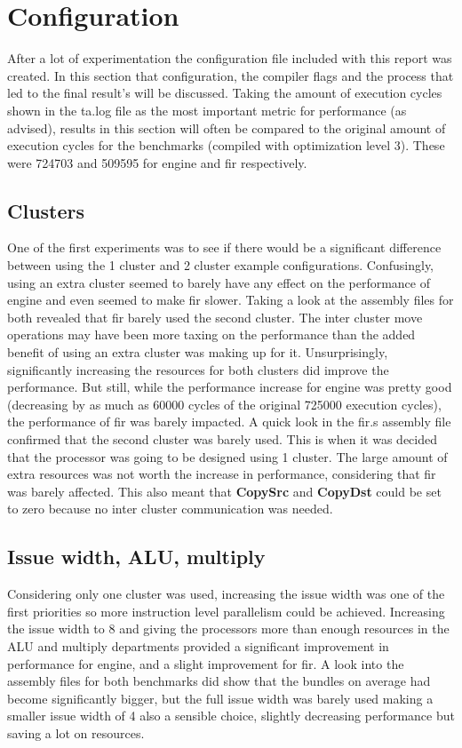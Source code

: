 \section{Configuration}
After a lot of experimentation the configuration file included with this report was created. In this section that configuration, the compiler flags and the process that led to the final result's will be discussed. Taking the amount of execution cycles shown in the ta.log file as the most important metric for performance (as advised), results in this section will often be compared to the original amount of execution cycles for the benchmarks (compiled with optimization level 3). These were 724703 and 509595 for engine and fir respectively.

\subsection{Clusters}
One of the first experiments was to see if there would be a significant difference between using the 1 cluster and 2 cluster example configurations. Confusingly, using an extra cluster seemed to barely have any effect on the performance of engine and even seemed to make fir slower. Taking a look at the assembly files for both revealed that fir barely used the second cluster. The inter cluster move operations may have been more taxing on the performance than the added benefit of using an extra cluster was making up for it. Unsurprisingly, significantly increasing the resources for both clusters did improve the performance. But still, while the performance increase for engine was pretty good (decreasing by as much as 60000 cycles of the original 725000 execution cycles), the performance of fir was barely impacted. A quick look in the fir.s assembly file confirmed that the second cluster was barely used. This is when it was decided that the processor was going to be designed using 1 cluster. The large amount of extra resources was not worth the increase in performance, considering that fir was barely affected. This also meant that \textbf{CopySrc} and \textbf{CopyDst} could be set to zero because no inter cluster communication was needed.

\subsection{Issue width, ALU, multiply}
Considering only one cluster was used, increasing the issue width was one of the first priorities so more instruction level parallelism could be achieved. Increasing the issue width to 8 and giving the processors more than enough resources in the ALU and multiply departments provided a significant improvement in performance for engine, and a slight improvement for fir. A look into the assembly files for both benchmarks did show that the bundles on average had become significantly bigger, but the full issue width was barely used making a smaller issue width of 4 also a sensible choice, slightly decreasing performance but saving a lot on resources.

